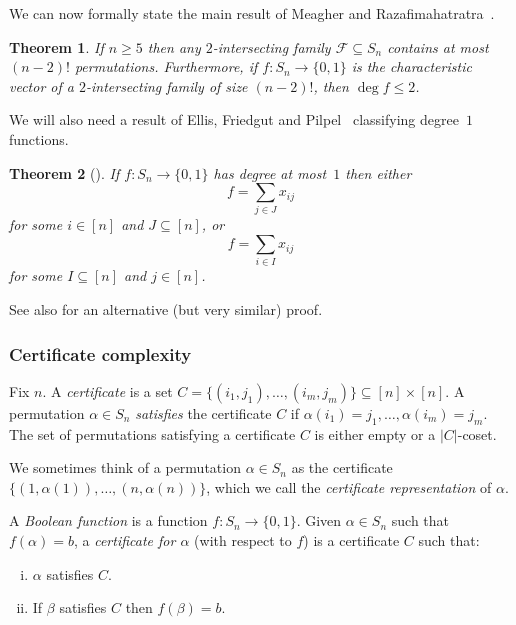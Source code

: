 \documentclass[10pt,a4paper]{amsart}
\newtheorem{theorem}{Theorem}[section]
\theoremstyle{definition}
\begin{document}
We can now formally state the main result of Meagher and Razafimahatratra~\cite[Corollary 5.5]{MR21}.

\begin{theorem} \label{thm:MR21}
If $n \geq 5$ then any $2$-intersecting family $\mathcal{F} \subseteq S_n$ contains at most $(n-2)!$ permutations. Furthermore, if $f\colon S_n \to \{0,1\}$ is the characteristic vector of a $2$-intersecting family of size $(n-2)!$, then $\deg f \leq 2$.
\end{theorem}

We will also need a result of Ellis, Friedgut and Pilpel~\cite{EFP} classifying degree~$1$ functions.

\begin{theorem}[{\cite[Corollary 2]{EFP}}] \label{thm:degree1-classification-sym}
If $f\colon S_n \to \{0,1\}$ has degree at most~$1$ then either
\[
 f = \sum_{j \in J} x_{ij}
\]
for some $i \in [n]$ and $J \subseteq [n]$, or
\[
 f = \sum_{i \in I} x_{ij}
\]
for some $I \subseteq [n]$ and $j \in [n]$.
\end{theorem}

See also \cite[Theorem 6.1]{DFLLV} for an alternative (but very similar) proof.

\subsubsection{Certificate complexity} \label{sec:certificate-sym}

Fix $n$. A \emph{certificate} is a set $C = \{(i_1,j_1),\ldots,(i_m,j_m)\} \subseteq [n] \times [n]$. A permutation $\alpha \in S_n$ \emph{satisfies} the certificate $C$ if $\alpha(i_1) = j_1,\ldots,\alpha(i_m) = j_m$. The set of permutations satisfying a certificate $C$ is either empty or a $|C|$-coset.

We sometimes think of a permutation $\alpha \in S_n$ as the certificate $\{(1,\alpha(1)),\ldots,(n,\alpha(n))\}$, which we call the \emph{certificate representation} of $\alpha$.

A \emph{Boolean function} is a function $f\colon S_n \to \{0,1\}$. Given $\alpha \in S_n$ such that $f(\alpha) = b$, a \emph{certificate for $\alpha$} (with respect to $f$) is a certificate $C$ such that:
\begin{enumerate}[(i)]
\item $\alpha$ satisfies $C$.
\item If $\beta$ satisfies $C$ then $f(\beta) = b$.
\end{enumerate}
\end{document}
